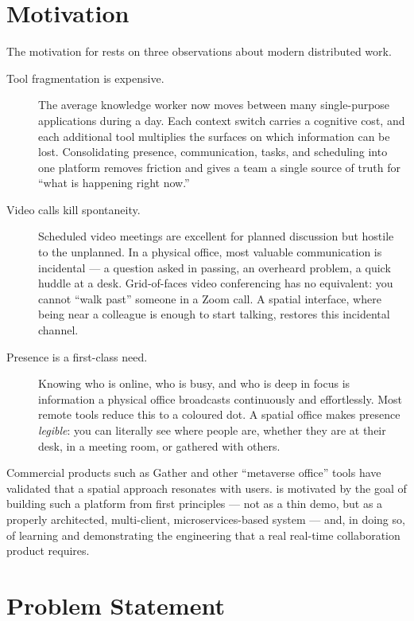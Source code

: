 \section{Motivation}

The motivation for \voname{} rests on three observations about modern
distributed work.

\begin{description}
  \item[Tool fragmentation is expensive.] The average knowledge worker
  now moves between many single-purpose applications during a day. Each context
  switch carries a cognitive cost, and each additional tool multiplies the
  surfaces on which information can be lost. Consolidating presence,
  communication, tasks, and scheduling into one platform removes friction and
  gives a team a single source of truth for ``what is happening right now.''

  \item[Video calls kill spontaneity.] Scheduled video meetings are excellent
  for planned discussion but hostile to the unplanned. In a physical office,
  most valuable communication is incidental --- a question asked in passing, an
  overheard problem, a quick huddle at a desk. Grid-of-faces video conferencing
  has no equivalent: you cannot ``walk past'' someone in a Zoom call. A spatial
  interface, where being near a colleague is enough to start talking, restores
  this incidental channel.

  \item[Presence is a first-class need.] Knowing who is online, who is busy, and
  who is deep in focus is information a physical office broadcasts continuously
  and effortlessly. Most remote tools reduce this to a coloured dot. A spatial
  office makes presence \emph{legible}: you can literally see where people are,
  whether they are at their desk, in a meeting room, or gathered with others.
\end{description}

Commercial products such as Gather and other ``metaverse office'' tools have
validated that a spatial approach resonates with users. \voname{} is motivated
by the goal of building such a platform from first principles --- not as a thin
demo, but as a properly architected, multi-client, microservices-based system ---
and, in doing so, of learning and demonstrating the engineering that a real
real-time collaboration product requires.

\section{Problem Statement}

